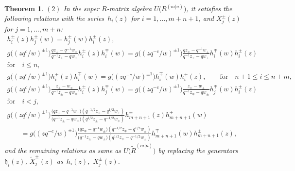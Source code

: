 \documentclass[10pt,a4paper]{amsart}
\numberwithin{equation}{section}
\newtheorem{Theorem}{Theorem}[section]
\begin{document}
\begin{Theorem}
$(2)$ In the super $R$-matrix algebra $U\bigl(R^{(m|n)}\bigr)$, it satisfies the following relations with the series~$h_i(z)$ for $i=1,\dots,m+n+1$, and $X_j^{\pm}(z)$ for $j=1,\dots,m+n$:
\begin{gather*}%
 h_i^{\pm}(z)h_j^{\pm}(w)=h_j^{\pm}(w)h_i^{\pm}(z), \\
 g\bigl((zq^c/w)^{\pm1}\bigr)\frac{qz_{\pm}-q^{-1}w_{\mp}}{q^{-1}z_{\pm}-qw_{\mp}}h_i^{\pm}(z)h_i^{\mp}(w)
 =g\bigl((zq^{-c}/w)^{\pm1}\bigr)\frac{qz_{\mp}-q^{-1}w_{\pm}}{q^{-1}z_{\mp}-qw_{\pm}}h_i^{\mp}(w)h_i^{\pm}(z)\\
 \text{for} \quad
 i\leq n,\\
 g\bigl((zq^{c}/w)^{\pm1}\bigr) h_i^{\pm}(z)h_i^{\mp}(w)=g\bigl((zq^{-c}/w)^{\pm1}\bigr)h_i^{\mp}(w)h_i^{\pm}(z), \qquad\textrm{for}\quad n+1\leq i\leq n+m,\\
 g\bigl((zq^{c}/w)^{\pm1}\bigr)\frac{z_{\pm}-w_{\mp}}{q^{-1}z_{\pm}-qw_{\mp}}h_i^{\pm}(z)h_j^{\mp}(w)=g\bigl((zq^{-c}/w)^{\pm1}\bigr)
 \frac{z_{\mp}-w_{\pm}}{q^{-1}z_{\mp}-qw_{\pm}}h_j^{\mp}(w)h_i^{\pm}(z)\\
 \text{for} \quad
 i<j,
\\
 g\bigl((zq^{c}/w)^{\pm1}\bigr)\frac{\bigl(qz_{\pm}-q^{-1}w_{\mp}\bigr)(q^{-1/2}z_{\pm}-q^{1/2}w_{\mp})}{\bigl(q^{-1}z_{\pm}-qw_{\mp}\bigr)
 (q^{1/2}z_{\pm}-q^{-1/2}w_{\mp})}h_{m+n+1}^{\pm}(z)h_{m+n+1}^{\mp}(w)\\
 \qquad=g\bigl((zq^{-c}/w)^{\pm1}\bigr)\frac{\bigl(qz_{\mp}-q^{-1}w_{\pm}\bigr)(q^{-1/2}z_{\mp}-q^{1/2}w_{\pm})}{\bigl(q^{-1}z_{\pm}-qw_{\pm}\bigr)
 (q^{1/2}z_{\mp}-q^{-1/2}w_{\pm})}h_{m+n+1}^{\mp}(w)h_{m+n+1}^{\pm}(z),
\end{gather*}
and the remaining relations as same as $U\bigl(\widetilde{R}^{(m|n)}\bigr)$ by replacing the generators $\mathfrak{h}_i(z)$, $\widetilde{X}_j^{\pm}(z)$ as~$h_i(z)$,~$X_j^{\pm}(z)$.
\end{Theorem}
\end{document}
